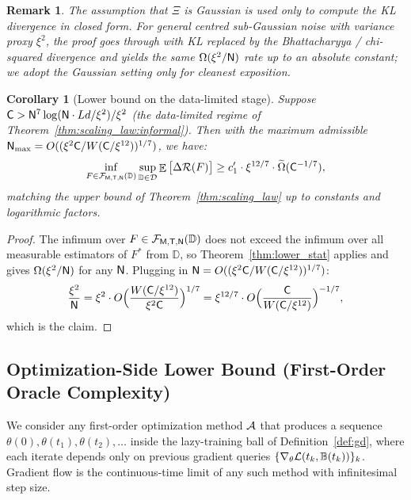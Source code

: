 \documentclass[11pt]{article}
\theoremstyle{plain}
\newtheorem{corollary}[theorem]{Corollary}
\newtheorem{remark}[theorem]{Remark}
\DeclareMathOperator*{\E}{{\mathbb{E}}}
\begin{document}
\begin{remark}\label{rem:non_gaussian}
    The assumption that $\Xi$ is Gaussian is used only to compute the KL divergence in closed form. For general centred sub-Gaussian noise with variance proxy $\xi^2$, the proof goes through with KL replaced by the Bhattacharyya / chi-squared divergence and yields the same $\Omega(\xi^2/{\sf N})$ rate up to an absolute constant; we adopt the Gaussian setting only for cleanest exposition.
\end{remark}

\begin{corollary}[Lower bound on the data-limited stage]\label{cor:lower_data_limited}
    Suppose ${\sf C} > {\sf N}^7\log({\sf N}\cdot Ld/\xi^2)/\xi^2$ (the data-limited regime of Theorem~\ref{thm:scaling_law:informal}). Then with the maximum admissible ${\sf N}_{\max} = O((\xi^2{\sf C}/W({\sf C}/\xi^{12}))^{1/7})$, we have:
    \begin{align*}
        \inf_{F\in{\cal F}_{\sf M, T, N}(\mathbb{D})}\sup_{\mathbb{D}\in{\cal D}}\E\big[\Delta{\cal R}(F)\big] \ge c_1' \cdot \xi^{12/7}\cdot \widetilde\Omega({\sf C}^{-1/7}),
    \end{align*}
    matching the upper bound of Theorem~\ref{thm:scaling_law} up to constants and logarithmic factors.
\end{corollary}

\begin{proof}
    The infimum over $F\in{\cal F}_{\sf M, T, N}(\mathbb{D})$ does not exceed the infimum over all measurable estimators of $F^*$ from $\mathbb{D}$, so Theorem~\ref{thm:lower_stat} applies and gives $\Omega(\xi^2/{\sf N})$ for any ${\sf N}$. Plugging in ${\sf N}=O((\xi^2{\sf C}/W({\sf C}/\xi^{12}))^{1/7})$:
    \begin{align*}
        \frac{\xi^2}{{\sf N}} = \xi^2 \cdot O\Big(\frac{W({\sf C}/\xi^{12})}{\xi^2{\sf C}}\Big)^{1/7} = \xi^{12/7}\cdot O\Big(\frac{{\sf C}}{W({\sf C}/\xi^{12})}\Big)^{-1/7},
    \end{align*}
    which is the claim.
\end{proof}

\subsection{Optimization-Side Lower Bound (First-Order Oracle Complexity)}\label{app_sub:lower_opt}

We consider any first-order optimization method ${\cal A}$ that produces a sequence $\theta(0), \theta(t_1), \theta(t_2), \dots$ inside the lazy-training ball of Definition~\ref{def:gd}, where each iterate depends only on previous gradient queries $\{\nabla_\theta {\cal L}(t_k, \mathbb{B}(t_k))\}_k$. Gradient flow is the continuous-time limit of any such method with infinitesimal step size.
\end{document}
